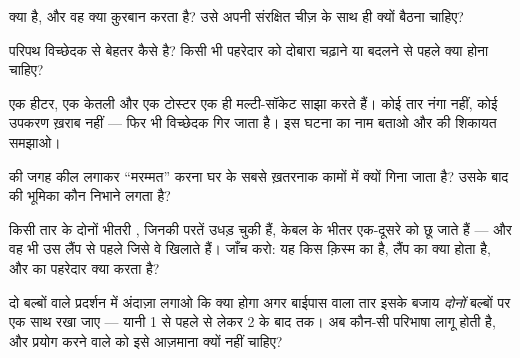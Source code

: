 \begin{exercise}[$\star$]\label{exo:g7:short-circuits-safety:5}
 क्या है, और वह क्या क़ुरबान करता है? उसे अपनी संरक्षित चीज़ के
साथ  ही क्यों बैठना चाहिए?
\end{exercise}

\begin{exercise}[$\star$]\label{exo:g7:short-circuits-safety:6}
परिपथ विच्छेदक  से बेहतर कैसे है? किसी भी पहरेदार को दोबारा
चढ़ाने या बदलने से पहले क्या होना चाहिए?
\end{exercise}

\begin{exercise}[$\star$]\label{exo:g7:short-circuits-safety:7}
एक हीटर, एक केतली और एक टोस्टर एक ही मल्टी-सॉकेट साझा करते हैं। कोई
तार नंगा नहीं, कोई उपकरण ख़राब नहीं --- फिर भी विच्छेदक गिर जाता है।
इस घटना का नाम बताओ और  की शिकायत समझाओ।
\end{exercise}

\begin{exercise}[$\star$]\label{exo:g7:short-circuits-safety:8}
 की जगह कील लगाकर ``मरम्मत'' करना घर के सबसे ख़तरनाक कामों में
क्यों गिना जाता है? उसके बाद  की भूमिका कौन निभाने लगता है?
\end{exercise}

\begin{exercise}[$\star\star$]\label{exo:g7:short-circuits-safety:9}
किसी तार के दोनों भीतरी , जिनकी परतें उधड़ चुकी हैं, केबल के भीतर
एक-दूसरे को छू जाते हैं --- और वह भी उस लैंप से पहले जिसे वे खिलाते
हैं। जाँच करो: यह किस क़िस्म का  है, लैंप का क्या होता है, और
 का पहरेदार क्या करता है?
\end{exercise}

\begin{exercise}[$\star\star$]\label{exo:g7:short-circuits-safety:10}
दो बल्बों वाले प्रदर्शन में अंदाज़ा लगाओ कि क्या होगा अगर बाईपास वाला
तार इसके बजाय \emph{दोनों} बल्बों पर एक साथ रखा जाए --- यानी  1 से
पहले से लेकर  2 के बाद तक। अब कौन-सी परिभाषा लागू होती है, और
प्रयोग करने वाले को इसे आज़माना क्यों नहीं चाहिए?
\end{exercise}

